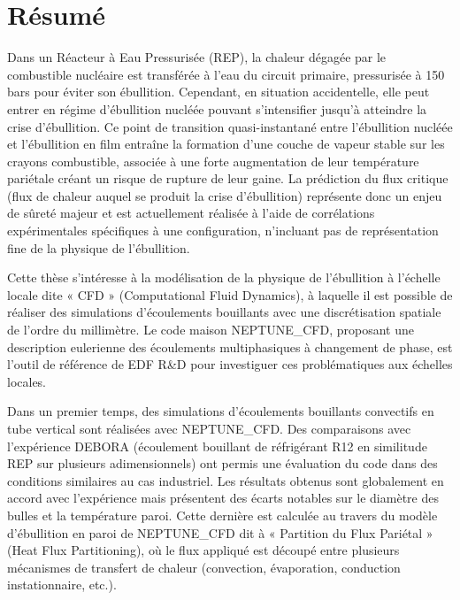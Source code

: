 


\begingroup
\let\clearpage\relax
\let\cleardoublepage\relax
\let\cleardoublepage\relax

\chapter*{Résumé}
Dans un Réacteur à Eau Pressurisée (REP), la chaleur dégagée par le combustible nucléaire est transférée à l’eau du circuit primaire, pressurisée à 150 bars pour éviter son ébullition. Cependant, en situation accidentelle, elle peut entrer en régime d’ébullition nucléée pouvant s’intensifier jusqu’à atteindre la crise d’ébullition. Ce point de transition quasi-instantané entre l’ébullition nucléée et l’ébullition en film entraîne la formation d’une couche de vapeur stable sur les crayons combustible, associée à une forte augmentation de leur température pariétale créant un risque de rupture de leur gaine. La prédiction du flux critique (flux de chaleur auquel se produit la crise d’ébullition) représente donc un enjeu de sûreté majeur et est actuellement réalisée à l’aide de corrélations expérimentales spécifiques à une configuration, n’incluant pas de représentation fine de la physique de l’ébullition. 

\npar


Cette thèse s’intéresse à la modélisation de la physique de l’ébullition à l’échelle locale dite « CFD » (Computational Fluid Dynamics), à laquelle il est possible de réaliser des simulations d’écoulements bouillants avec une discrétisation spatiale de l’ordre du millimètre. Le code maison NEPTUNE\_CFD, proposant une description eulerienne des écoulements multiphasiques à changement de phase, est l’outil de référence de EDF R\&D pour investiguer ces problématiques aux échelles locales. 

\npar

Dans un premier temps, des simulations d’écoulements bouillants convectifs en tube vertical sont réalisées avec NEPTUNE\_CFD. Des comparaisons avec l’expérience DEBORA (écoulement bouillant de réfrigérant R12 en similitude REP sur plusieurs adimensionnels) ont permis une évaluation du code dans des conditions similaires au cas industriel. Les résultats obtenus sont globalement en accord avec l’expérience mais présentent des écarts notables sur le diamètre des bulles et la température paroi. Cette dernière est calculée au travers du modèle d’ébullition en paroi de NEPTUNE\_CFD dit à « Partition du Flux Pariétal » (Heat Flux Partitioning), où le flux appliqué est découpé entre plusieurs mécanismes de transfert de chaleur (convection, évaporation, conduction instationnaire, etc.). 

